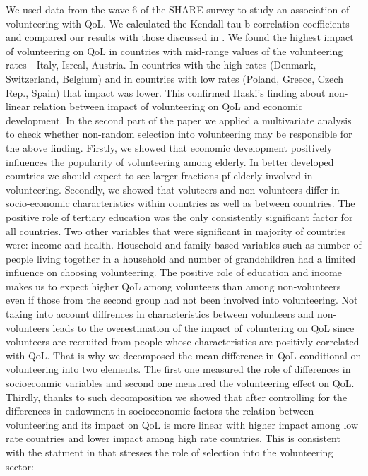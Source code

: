 \documentclass[10pt, letterpaper]{article}
\begin{document}
\begin{spacing}{1.4}
We used data from the wave 6 of the SHARE survey to study an association of volunteering with QoL. We calculated the Kendall tau-b correlation coefficients and compared  our results with those discussed in \citet{haski09}. We found the highest impact of volunteering on QoL in countries with mid-range values of the volunteering rates - Italy, Isreal, Austria. In countries with the high rates (Denmark, Switzerland, Belgium) and in countries with low rates (Poland, Greece, Czech Rep., Spain) that impact was lower. This confirmed Haski's finding about non-linear relation between impact of volunteering on QoL and economic development. 
In the second part of the paper we applied a multivariate analysis to check whether non-random selection into volunteering may be responsible for the above finding. Firstly, we showed that economic development positively influences the popularity of volunteering among elderly. In better developed countries we should expect to see larger fractions pf elderly involved in volunteering. Secondly, we showed that voluteers and non-volunteers differ in socio-economic characteristics within countries as well as between countries. The positive role of tertiary education was the only consistently significant factor for all countries. Two other variables that were significant in majority of countries were: income and health. Household and family based variables such as number of people living together in a household and number of grandchildren had a limited influence on choosing volunteering. The positive role of education and income makes us to expect higher QoL among volunteers than among non-volunteers even if those from the second group had not been involved into volunteering. Not taking into account diffrences in characteristics between volunteers and non-volunteers leads to the overestimation of the impact of voluntering on QoL since volunteers are recruited from people whose characteristics are positivly correlated with QoL. That is why we decomposed the mean difference in QoL conditional on volunteering into two elements. The first one measured the role of differences in socioeconmic variables and second one measured the  volunteering effect on QoL. Thirdly, thanks to such decomposition we showed that after controlling for the differences in endowment in socioeconomic factors the relation between  volunteering and its impact on QoL is more linear with higher impact among low rate countries and lower impact among high rate countries. This is consistent with the statment in \citet{plagnol10} that stresses the role of selection into the volunteering sector:


\end{spacing}
\end{document}
